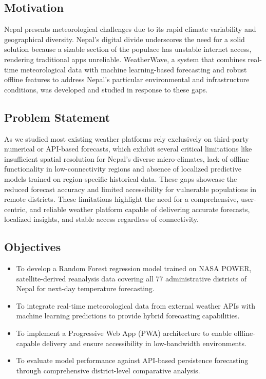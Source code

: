 \documentclass[conference]{IEEEtran}
\begin{document}
\subsection{Motivation}
Nepal presents meteorological challenges due to its rapid climate variability and geographical diversity. Nepal's digital divide underscores the need for a solid solution because a sizable section of the populace has unstable internet access, rendering traditional apps unreliable. WeatherWave, a system that combines real-time meteorological data with machine learning-based forecasting and robust offline features to address Nepal's particular environmental and infrastructure conditions, was developed and studied in response to these gaps.

\subsection{Problem Statement}

As we studied most existing weather platforms rely exclusively on third-party numerical or API-based forecasts, which exhibit several critical limitations like insufficient spatial resolution for Nepal's diverse micro-climates, lack of offline functionality in low-connectivity regions and absence of localized predictive models trained on region-specific historical data. These gaps showcase the reduced forecast accuracy and limited accessibility for vulnerable populations in remote districts. These limitations highlight the need for a comprehensive, user-centric, and reliable weather platform capable of delivering accurate forecasts, localized insights, and stable access regardless of connectivity.
\subsection{Objectives}
\begin{itemize}

  \item To develop a Random Forest regression model trained on NASA POWER, satellite-derived reanalysis data covering all 77 administrative districts of Nepal for next-day temperature forecasting.
  \item To integrate real-time meteorological data from external weather APIs with machine learning predictions to provide hybrid forecasting capabilities.
  \item To implement a Progressive Web App (PWA) architecture to enable offline-capable delivery and ensure accessibility in low-bandwidth environments.
  \item To evaluate model performance against API-based persistence forecasting through comprehensive district-level comparative analysis.
\end{itemize}
\end{document}
